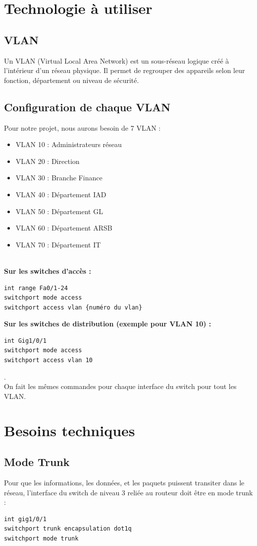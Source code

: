 \documentclass[a4paper,12pt]{article}
\begin{document}
\section{Technologie à utiliser}

\subsection{VLAN}
Un VLAN (Virtual Local Area Network) est un sous-réseau logique créé à l'intérieur d’un réseau physique. Il permet de regrouper des appareils selon leur fonction, département ou niveau de sécurité.

\subsection{Configuration de chaque VLAN}
Pour notre projet, nous aurons besoin de 7 VLAN :

\begin{itemize}
    \item VLAN 10 : Administrateurs réseau
    \item VLAN 20 : Direction
    \item VLAN 30 : Branche Finance
    \item VLAN 40 : Département IAD
    \item VLAN 50 : Département GL
    \item VLAN 60 : Département ARSB
    \item VLAN 70 : Département IT
\end{itemize}

\textbf{\\Sur les switches d'accès :}
\begin{verbatim}
int range Fa0/1-24
switchport mode access
switchport access vlan {numéro du vlan}
\end{verbatim}

\textbf{Sur les switches de distribution (exemple pour VLAN 10) :}
\begin{verbatim}
int Gig1/0/1
switchport mode access
switchport access vlan 10
\end{verbatim}
.\\On fait les mêmes commandes pour chaque interface du switch pour tout les VLAN. 

\section{Besoins techniques}

\subsection{Mode Trunk}
Pour que les informations, les données, et les paquets puissent transiter dans le réseau, l’interface du switch de niveau 3 reliée au routeur doit être en mode trunk :
\begin{verbatim}
int gig1/0/1
switchport trunk encapsulation dot1q
switchport mode trunk
\end{verbatim}
\end{document}
